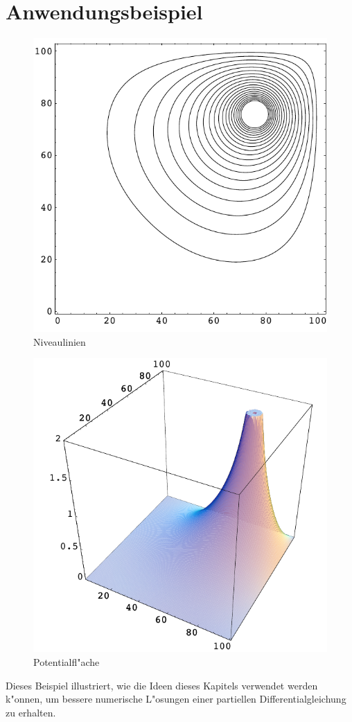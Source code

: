 \section{Anwendungsbeispiel}
\begin{figure}
\begin{center}
\includegraphics[width=0.8\hsize]{graphics/neilcontour}
\end{center}
\caption{Niveaulinien\label{neilcontour}}
\end{figure}
\begin{figure}
\begin{center}
\includegraphics[width=0.8\hsize]{graphics/neilloesung}
\end{center}
\caption{Potentialfl"ache\label{neilloesung}}
\end{figure}
Dieses Beispiel illustriert, wie die Ideen dieses Kapitels verwendet werden k"onnen,
um bessere numerische L"osungen einer partiellen Differentialgleichung
zu erhalten.

